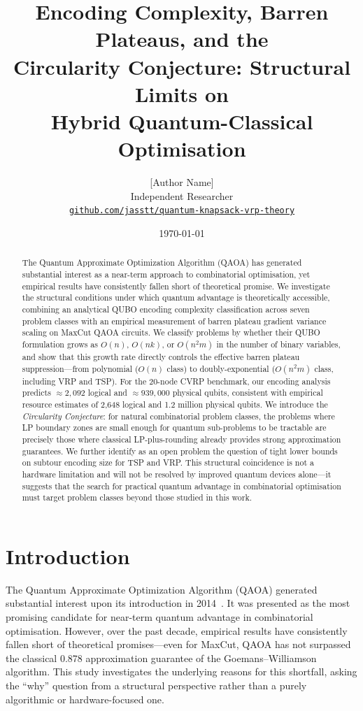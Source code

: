 \documentclass[11pt]{article}
\title{\textbf{Encoding Complexity, Barren Plateaus, and the\\
Circularity Conjecture: Structural Limits on\\
Hybrid Quantum-Classical Optimisation}}
\author{[Author Name]\\
\small Independent Researcher\\
\small \href{https://github.com/jasstt/quantum-knapsack-vrp-theory}%
{\texttt{github.com/jasstt/quantum-knapsack-vrp-theory}}}
\date{\today}
\theoremstyle{remark}
\begin{document}
\maketitle

\begin{abstract}
The Quantum Approximate Optimization Algorithm (QAOA) has generated
substantial interest as a near-term approach to combinatorial optimisation,
yet empirical results have consistently fallen short of theoretical promise.
We investigate the structural conditions under which quantum advantage is
theoretically accessible, combining an analytical QUBO encoding complexity
classification across seven problem classes with an empirical measurement of
barren plateau gradient variance scaling on MaxCut QAOA circuits.
We classify problems by whether their QUBO formulation grows as $O(n)$,
$O(nk)$, or $O(n^2m)$ in the number of binary variables, and show that this
growth rate directly controls the effective barren plateau suppression---from
polynomial ($O(n)$ class) to doubly-exponential ($O(n^2m)$ class, including
VRP and TSP).
For the 20-node CVRP benchmark, our encoding analysis predicts
$\approx 2{,}092$ logical and $\approx 939{,}000$ physical qubits, consistent
with empirical resource estimates of 2,648 logical and 1.2 million physical
qubits.
We introduce the \emph{Circularity Conjecture}: for natural combinatorial
problem classes, the problems where LP boundary zones are small enough for
quantum sub-problems to be tractable are precisely those where classical
LP-plus-rounding already provides strong approximation guarantees.
We further identify as an open problem the question of tight lower bounds on
subtour encoding size for TSP and VRP.
This structural coincidence is not a hardware limitation and will not be
resolved by improved quantum devices alone---it suggests that the search for
practical quantum advantage in combinatorial optimisation must target problem
classes beyond those studied in this work.
\end{abstract}

\tableofcontents
\newpage

\section{Introduction}
\label{sec:intro}

The Quantum Approximate Optimization Algorithm (QAOA) generated substantial interest upon its introduction in 2014~\cite{farhi2014qaoa}. It was presented as the most promising candidate for near-term quantum advantage in combinatorial optimisation. However, over the past decade, empirical results have consistently fallen short of theoretical promises---even for MaxCut, QAOA has not surpassed the classical 0.878 approximation guarantee of the Goemans--Williamson algorithm. This study investigates the underlying reasons for this shortfall, asking the ``why'' question from a structural perspective rather than a purely algorithmic or hardware-focused one.
\end{document}
